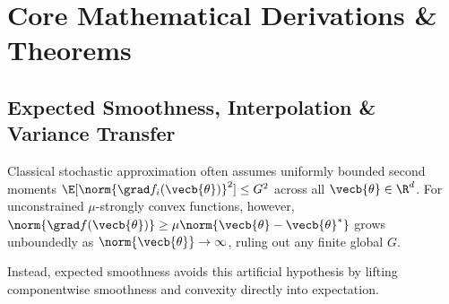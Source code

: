 \documentclass[../../../../master.tex]{subfiles}
\begin{document}
\section{Core Mathematical Derivations \& Theorems}
\label{sec:sgd:derivations}

\subsection{Expected Smoothness, Interpolation \& Variance Transfer}
\label{sec:sgd:expected-smoothness}

Classical stochastic approximation often assumes uniformly bounded second moments $\E[\norm{\grad f_i(\vecb{\theta})}^2] \le G^2$ across all $\vecb{\theta} \in \R^d$. For unconstrained $\mu$-strongly convex functions, however, $\norm{\grad f(\vecb{\theta})} \ge \mu\norm{\vecb{\theta} - \vecb{\theta}^*}$ grows unboundedly as $\norm{\vecb{\theta}} \to \infty$, ruling out any finite global $G$.

Instead, expected smoothness  avoids this artificial hypothesis by lifting componentwise smoothness and convexity directly into expectation.
\end{document}
